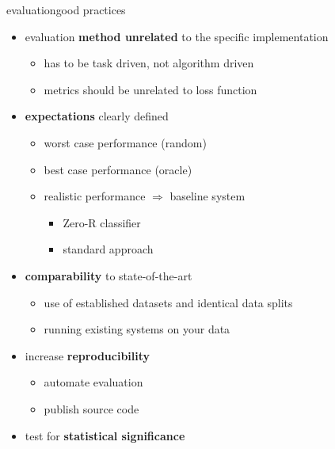         \begin{frame}{evaluation}{good practices}
           \begin{itemize}
                \item   evaluation \textbf{method unrelated} to the specific implementation
                    \begin{itemize}
                        \item   has to be task driven, not algorithm driven
                        \item   metrics should be unrelated to loss function
                    \end{itemize}
                \item<2->   \textbf{expectations} clearly defined
                    \begin{itemize}
                        \item   worst case performance (random)
                        \item   best case performance (oracle)
                        \item   realistic performance $\Rightarrow$ baseline system
                            \begin{itemize}
                                \item   Zero-R classifier
                                \item   standard approach
                            \end{itemize}
                    \end{itemize}
                \item<3->   \textbf{comparability} to state-of-the-art
                    \begin{itemize}
                        \item   use of established datasets and identical data splits
                        \item   running existing systems on your data
                    \end{itemize}
               \item<4->   increase \textbf{reproducibility}
                    \begin{itemize}
                        \item   automate evaluation
                        \item   publish source code
                    \end{itemize}
               \item<5->   test for \textbf{statistical significance}
            \end{itemize}
        \end{frame}

